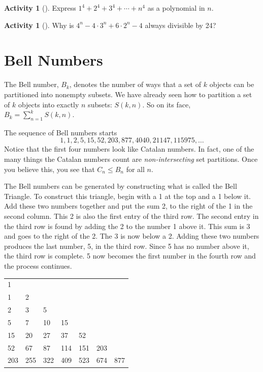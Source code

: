 \documentclass[10pt,]{book}
\theoremstyle{plain}
\theoremstyle{definition}
\theoremstyle{definition}
\theoremstyle{definition}
\newtheorem{activity}[project]{Activity}
\numberwithin{equation}{chapter}
\begin{document}
\begin{activity}[]\label{activity-288}
\hypertarget{p-1468}{}%
Express \(1^4 + 2^4 + 3^4 + \cdots + n^4\) as a polynomial in \(n\).%
\end{activity}
\begin{activity}[]\label{activity-289}
\hypertarget{p-1469}{}%
Why is \(4^n - 4\cdot 3^n + 6\cdot 2^n - 4\) always divisible by 24?%
\end{activity}
\typeout{************************************************}
\typeout{************************************************}
\section[{Bell Numbers}]{Bell Numbers}\label{sec_adv-bell}
\hypertarget{p-1470}{}%
The Bell number, \(B_{k}\), denotes the number of ways that a set of \(k\) objects can be partitioned into nonempty subsets. We have already seen how to partition a set of \(k\) objects into exactly \(n\) subsets: \(S(k,n)\).  So on its face, \(B_k = \sum_{n=1}^kS(k,n)\).%
\par
\hypertarget{p-1471}{}%
The sequence of Bell numbers starts%
\begin{equation*}
1, 1, 2, 5, 15, 52, 203, 877, 4040, 21147, 115975, \ldots
\end{equation*}
Notice that the first four numbers look like Catalan numbers.  In fact, one of the many things the Catalan numbers count are \emph{non-intersecting} set partitions.  Once you believe this, you see that \(C_n \le B_n\) for all \(n\).%
\par
\hypertarget{p-1472}{}%
The Bell numbers can be generated by constructing what is called the Bell Triangle. To construct this triangle, begin with a 1 at the top and a 1 below it. Add these two numbers together and put the sum 2, to the right of the 1 in the second column. This 2 is also the first entry of the third row. The second entry in the third row is found by adding the 2 to the number 1 above it. This sum is 3 and goes to the right of the 2. The 3 is now below a 2. Adding these two numbers produces the last number, 5, in the third row. Since 5 has no number above it, the third row is complete. 5 now becomes the first number in the fourth row and the process continues.%
\begin{sidebyside}{1}{0.15}{0.15}{0}
\begin{sbspanel}{0.7}
{\centering%
\begin{tabular}{lllllll}
1&&&&&&\tabularnewline[0pt]
1&2&&&&&\tabularnewline[0pt]
2&3&5&&&&\tabularnewline[0pt]
5&7&10&15&&&\tabularnewline[0pt]
15&20&27&37&52&&\tabularnewline[0pt]
52&67&87&114&151&203&\tabularnewline[0pt]
203&255&322&409&523&674&877
\end{tabular}
\par}
\end{sbspanel}
\end{sidebyside}
\end{document}
